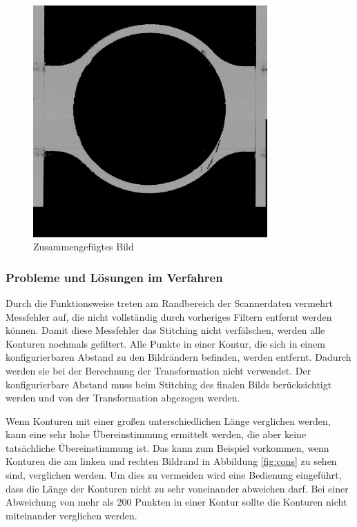 \begin{figure}[h]
    \centering
    \includegraphics[width=0.8\textwidth]{images/AM_SP0_stitched_2.png} %
    \caption{Zusammengefügtes Bild}
    \label{fig:stitched_image}
\end{figure}

\subsubsection*{Probleme und Lösungen im Verfahren}

Durch die Funktionsweise treten am Randbereich der Scannerdaten vermehrt Messfehler auf, 
die nicht vollständig durch vorheriges Filtern entfernt werden können. 
Damit diese Messfehler das Stitching nicht verfälschen, werden alle Konturen nochmals 
gefiltert. Alle Punkte in einer Kontur, die sich in einem konfigurierbaren 
Abstand zu den Bildrändern befinden, werden entfernt. Dadurch werden sie bei der 
Berechnung der Transformation nicht verwendet. 
Der konfigurierbare Abstand muss beim Stitching des finalen Bilds berücksichtigt 
werden und von der Transformation abgezogen werden.

Wenn Konturen mit einer großen unterschiedlichen Länge verglichen werden, 
kann eine sehr hohe Übereinstimmung ermittelt werden, die aber keine 
tatsächliche Übereinstimmung ist. Das kann zum Beispiel vorkommen, wenn Konturen 
die am linken und rechten Bildrand in Abbildung \ref{fig:cons} zu sehen sind, 
verglichen werden. Um dies zu vermeiden wird eine Bedienung eingeführt, dass die Länge
der Konturen nicht zu sehr voneinander abweichen darf. Bei einer Abweichung von mehr als
200 Punkten in einer Kontur sollte die Konturen nicht miteinander verglichen werden.

